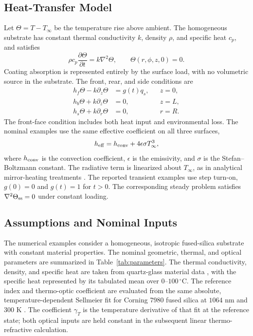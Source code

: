 \documentclass{optica-article}
\begin{document}
\subsection{Heat-Transfer Model}
Let $\Theta=T-T_\infty$ be the temperature rise above ambient.
The homogeneous substrate has constant thermal conductivity $k$, density $\rho$, and specific heat $c_p$, and satisfies
\begin{equation}
 \rho c_p\frac{\partial\Theta}{\partial t}=k\nabla^2\Theta,
 \qquad \Theta(r,\phi,z,0)=0.
 \label{eq:heat}
\end{equation}
Coating absorption is represented entirely by the surface load, with no volumetric source in the substrate.
The front, rear, and side conditions are
\begin{align}
 h_f\Theta-k\partial_z\Theta&=g(t)q_s, &&z=0,\label{eq:front}\\
 h_b\Theta+k\partial_z\Theta&=0, &&z=L,\label{eq:rear}\\
 h_s\Theta+k\partial_r\Theta&=0, &&r=R.\label{eq:side}
\end{align}
The front-face condition includes both heat input and environmental loss.
The nominal examples use the same effective coefficient on all three surfaces,
\begin{equation}
 h_{\rm eff}=h_{\rm conv}+4\epsilon\sigma T_\infty^3,
 \label{eq:heff}
\end{equation}
where $h_{\rm conv}$ is the convection coefficient, $\epsilon$ is the emissivity, and $\sigma$ is the Stefan--Boltzmann constant.
The radiative term is linearized about $T_\infty$, as in analytical mirror-heating treatments \cite{vinet2009}.
The reported transient examples use step turn-on, $g(0)=0$ and $g(t)=1$ for $t>0$.
The corresponding steady problem satisfies $\nabla^2\Theta_{\rm ss}=0$ under constant loading.

\subsection{Assumptions and Nominal Inputs}
The numerical examples consider a homogeneous, isotropic fused-silica substrate with constant material properties.
The nominal geometric, thermal, and optical parameters are summarized in Table~\ref{tab:parameters}.
The thermal conductivity, density, and specific heat are taken from quartz-glass material data \cite{heraeus}, with the specific heat represented by its tabulated mean over $0$--$100\,{}^\circ$C.
The reference index and thermo-optic coefficient are evaluated from the same absolute, temperature-dependent Sellmeier fit for Corning 7980 fused silica at $1064$ nm and $300$ K \cite{leviton2006}.
The coefficient $\gamma_T$ is the temperature derivative of that fit at the reference state; both optical inputs are held constant in the subsequent linear thermo-refractive calculation.
\end{document}
